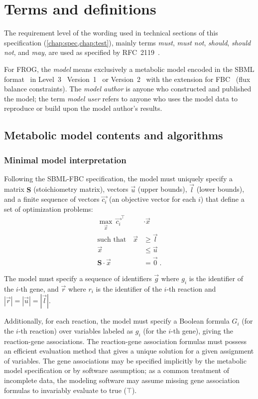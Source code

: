 \section{Terms and definitions}

The requirement level of the wording used in technical sections of this specification (\cref{chap:spec,chap:test}), mainly terms \emph{must}, \emph{must not}, \emph{should}, \emph{should not}, and \emph{may}, are used as specified by RFC~2119~\cite{rfc2119}.

For FROG, the \emph{model} means exclusively a metabolic model encoded in the SBML format~\cite{hucka2003systems} in Level~3~\cite{keating2020sbml} Version~1~\cite{Hucka2018b} or Version~2~\cite{Hucka2019} with the extension for FBC~\cite{olivier2018sbmlfbc} (flux balance constraints).
The \emph{model author} is anyone who constructed and published the model; the term \emph{model user} refers to anyone who uses the model data to reproduce or build upon the model author's results.

\subsection{Metabolic model contents and algorithms}
\label{sec:algos}

\subsubsection{Minimal model interpretation}

Following the SBML-FBC specification, the model must uniquely specify a matrix $\mathbf{S}$ (stoichiometry matrix), vectors $\vec{u}$ (upper bounds), $\vec{l}$ (lower bounds), and a finite sequence of vectors $\vec{c_i}$ (an objective vector for each $i$) that define a set of optimization problems:
\begin{align*}
\max_{\vec{x}}\ \vec{c_i}^\intercal &\cdot \vec{x} \\
\text{such that}\quad
\vec{x} & \geq \vec{l} \\
\vec{x} & \leq \vec{u} \\
\mathbf{S}\cdot \vec{x} &= \vec{0}\;\text{.}
\end{align*}

The model must specify a sequence of identifiers $\vec{g}$ where $g_i$ is the identifier of the $i$-th gene, and $\vec{r}$ where $r_i$ is the identifier of the $i$-th reaction and $|\vec{r}| = |\vec{u}| = |\vec{l}|$.

Additionally, for each reaction, the model must specify a Boolean formula $G_i$ (for the $i$-th reaction) over variables labeled as $g_i$ (for the $i$-th gene), giving the reaction-gene associations.
The reaction-gene association formulas must possess an efficient evaluation method that gives a unique solution for a given assignment of variables.
The gene associations may be specified implicitly by the metabolic model specification or by software assumption; as a common treatment of incomplete data, the modeling software may assume missing gene association formulas to invariably evaluate to true ($\top$).

